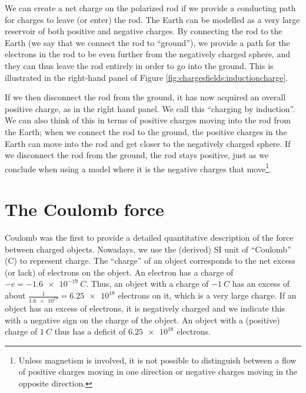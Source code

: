 We can create a net charge on the polarized rod if we provide a conducting path for charges to leave (or enter) the rod. The Earth can be modelled as a very large reservoir of both positive and negative charges. By connecting the rod to the Earth (we say that we connect the rod to ``ground''), we provide a path for the electrons in the rod to be even further from the negatively charged sphere, and they can thus leave the rod entirely in order to go into the ground. This is illustrated in the right-hand panel of Figure \ref{fig:chargesfields:inductioncharge}.

If we then disconnect the rod from the ground, it has now acquired an overall positive charge, as in the right hand panel. We call this ``charging by induction''. We can also think of this in terms of positive charges moving into the rod from the Earth; when we connect the rod to the ground, the positive charges in the Earth can move into the rod and get closer to the negatively charged sphere. If we disconnect the rod from the ground, the rod stays positive, just as we conclude when using a model where it is the negative charges that move\footnote{Unless magnetism is involved, it is not possible to distinguish between a flow of positive charges moving in one direction or negative charges moving in the opposite direction.}.


\section{The Coulomb force}
Coulomb was the first to provide a detailed quantitative description of the force between charged objects. Nowadays, we use the (derived) SI unit of ``Coulomb'' (C) to represent charge. The ``charge'' of an object corresponds to the net excess (or lack) of electrons on the object. An electron has a charge of $-e=\SI{-1.6e-19}{C}$. Thus, an object with a charge of $\SI{-1}{C}$ has an excess of about $\frac{1}{\num{1.6e19}}=\num{6.25e18}$ electrons on it, which is a very large charge. If an object has an excess of electrons, it is negatively charged and we indicate this with a negative sign on the charge of the object. An object with a (positive) charge of $\SI{1}{C}$ thus has a deficit of $\num{6.25e18}$ electrons.

